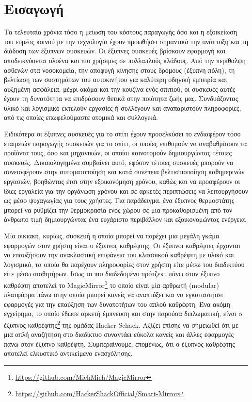 \chapter{Εισαγωγή}
\label{chapter:intro}

\setlength{\parskip}{1em}
Τα τελευταία χρόνια τόσο η μείωση του κόστους παραγωγής όσο και η εξοικείωση του ευρέος κοινού με την τεχνολογία έχουν προωθήσει σημαντικά την ανάπτυξη και τη διάδοση των έξυπνων συσκευών. Οι έξυπνες συσκευές βρίσκουν εφαρμογή και αποδεικνύονται ολοένα και πιο χρήσιμες σε πολλαπλούς κλάδους. Από την περίθαλψη ασθενών στα νοσοκομεία, την αποφυγή κίνησης στους δρόμους (έξυπνη πόλη), τη βελτίωση των συστημάτων του αυτοκινήτου για καλύτερη οδηγική εμπειρία και αυξημένη ασφάλεια, μέχρι ακόμα και την κουζίνα ενός σπιτιού, οι συσκευές αυτές έχουν τη δυνατότητα να επιδράσουν θετικά στην ποιότητα ζωής μας. Συνδυάζοντας υλικό και λογισμικό εκτελούν εργασίες ή συλλέγουν και αναπαριστούν πληροφορίες, από τις οποίες επωφελούμαστε ατομικά και συλλογικά. 

Ειδικότερα οι έξυπνες συσκευές για το σπίτι έχουν προσελκύσει το ενδιαφέρον τόσο εταιρειών παραγωγής συσκευών για το σπίτι, οι οποίες επιθυμούν να αναβαθμίσουν τα προϊόντα τους, όσο και μηχανικών, οι οποίοι καινοτομούν δημιουργώντας τέτοιες συσκευές. Δικαιολογημένα συμβαίνει αυτό, εφόσον τέτοιες συσκευές μπορούν να συνεισφέρουν στην αυτοματοποίηση και κατά συνέπεια βελτιστιοποίηση καθημερινών εργασιών, βοηθώντας έτσι στην εξοικονόμηση χρόνου, καθώς και να προσφέρουν οι ίδιες εργαλεία για την οργάνωση χρόνου και σε αρκετές περιπτώσεις να λειτουργήσουν ως μέσο ψυχαγωγίας για τους χρήστες. Για παράδειγμα, ένα έξυπνος θερμοστάτης μπορεί να ρυθμίζει την θερμοκρασία ενός χώρου σε μια προκαθορισμένη από τον άνθρωπο τιμή δημιουργώντας ένα ευχάριστο περιβάλλον και εξοικονομώντας ενέργεια.

Μία οικιακή, κυρίως, συσκευή η οποία μπορεί να παρέχει μια μεγάλη γκάμα εφαρμογών στον χρήστη είναι ο έξυπνος καθρέφτης. Οι έξυπνοι καθρέφτες έρχονται να επαυξήσουν την ανακλαστική επιφάνεια του κλασσικού καθρέφτη με υλικό και λογισμικό, τα οποία θα παρέχουν πληροφορίες στον χρήστη είτε μέσω του διαδικτύου είτε μέσω αισθητήρων. Ίσως το πιο διαδεδομένο πρότζεκτ πάνω στον έξυπνο καθρέφτη αποτελεί το MagicMirror\footnote{\href{https://github.com/MichMich/MagicMirror}{https://github.com/MichMich/MagicMirror}} το οποίο είναι μία αρθρωτή (modular) πλατφόρμα πάνω στην οποία μπορεί κανείς να αναπτύξει και να εγκαταστήσει εφαρμογές για την επαύξηση των δυνατοτήτων του απλού καθρέφτη. Ένα ακόμη εγχείρημα, το οποίο έδωσε αρκετή έμπνευση και στην παρούσα διπλωματική, είναι o έξυπνος καθρέφτης\footnote{\href{https://github.com/HackerShackOfficial/Smart-Mirror}{https://github.com/HackerShackOfficial/Smart-Mirror}} της ομάδας Hacker Schack. Αξίζει επίσης να σημειωθεί ότι με μια απλή αναζήτηση στο διαδίκτυο συναντάει εύκολα κανείς και άλλες εφαρμογές πάνω στον έξυπνο καθρέφτη. Συμπεραίνουμε, επομένως, ότι ο έξυπνος καθρέφτης αποτελεί ελκυστικό αντικείμενο ενασχόλησης.




